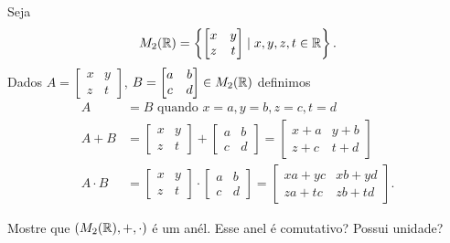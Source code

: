 \documentclass[12pt]{exam}
\begin{document}
\questao Seja
\[
    M_2(\mathbb{R}) = \left\{\begin{bmatrix}
        x & y\\z & t 
    \end{bmatrix} \mid x, y, z, t \in \mathbb{R} \right\}.
\]
Dados $A = \begin{bmatrix}
        x & y\\z & t 
    \end{bmatrix}$, $B = \begin{bmatrix}
        a & b\\c & d 
    \end{bmatrix} \in M_2(\mathbb{R})$ definimos
\begin{align*}
    A &= B \mbox{ quando } x = a, y = b, z = c, t = d\\
    A + B &= \begin{bmatrix}
        x & y\\z & t 
    \end{bmatrix} + \begin{bmatrix}
        a & b\\c & d 
    \end{bmatrix} = \begin{bmatrix}
        x + a & y + b\\z + c & t + d 
    \end{bmatrix}\\
    A \cdot B &= \begin{bmatrix}
        x & y\\z & t 
    \end{bmatrix} \cdot \begin{bmatrix}
        a & b\\c & d 
    \end{bmatrix} = \begin{bmatrix}
        xa + yc & xb + yd\\za + tc & zb + td 
    \end{bmatrix}.
\end{align*}

Mostre que $(M_2(\mathbb{R}), + , \cdot)$ \'e um an\'el. Esse anel \'e comutativo? Possui unidade?
\end{document}
